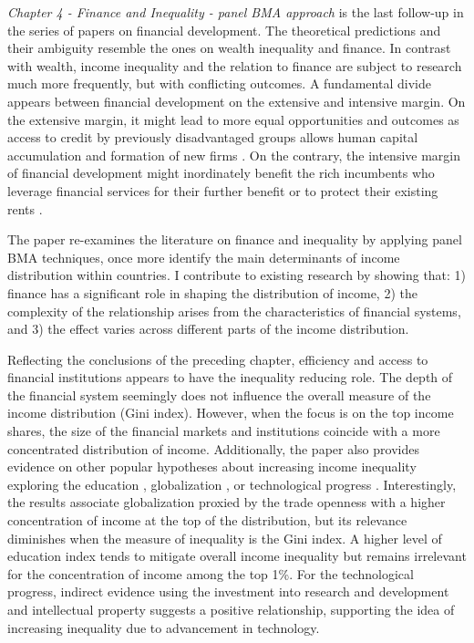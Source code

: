 \begin{refsection}
\emph{Chapter 4 - Finance and Inequality - panel BMA approach} is the last follow-up in the series of papers on financial development. The theoretical predictions and their ambiguity resemble the ones on wealth inequality and finance. In contrast with wealth, income inequality and the relation to finance are subject to research much more frequently, but with conflicting outcomes. A fundamental divide appears between financial development on the extensive and intensive margin. On the extensive margin, it might lead to more equal opportunities and outcomes as access to credit by previously disadvantaged groups allows human capital accumulation \parencite{braunetal2019,galormoav2004} and formation of new firms \parencite{banerjeenewman1990,evans1989estimated}. On the contrary, the intensive margin of financial development might inordinately benefit the rich incumbents who leverage financial services for their further benefit or to protect their existing rents \parencite{GreenwoodJovanovic1990,perotti2007investor}.

The paper re-examines the literature on finance and inequality by applying panel \ac{BMA} techniques, once more identify the main determinants of income distribution within countries. I contribute to existing research by showing that: 1) finance has a significant role in shaping the distribution of income, 2) the complexity of the relationship arises from the characteristics of financial systems, and 3) the effect varies across different parts of the income distribution. 

Reflecting the conclusions of the preceding chapter, efficiency and access to financial institutions appears to have the inequality reducing role. The depth of the financial system seemingly does not influence the overall measure of the income distribution (Gini index). However, when the focus is on the top income shares, the size of the financial markets and institutions coincide with a more concentrated distribution of income. Additionally, the paper also provides evidence on other popular hypotheses about increasing income inequality exploring the education \parencite{goldin2009race}, globalization \parencite{Jaumotte2013}, or technological progress \parencite{dabla2015causes}. Interestingly, the results associate globalization proxied by the trade openness with a higher concentration of income at the top of the distribution, but its relevance diminishes when the measure of inequality is the Gini index. A higher level of education index tends to mitigate overall income inequality but remains irrelevant for the concentration of income among the top 1\%. For the technological progress, indirect evidence using the investment into research and development and intellectual property suggests a positive relationship, supporting the idea of increasing inequality due to advancement in technology.


\end{refsection}
